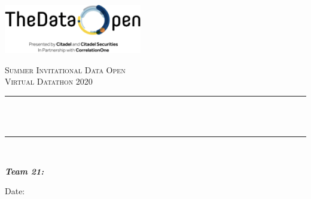 \begin{titlepage}

\newcommand{\HRule}{\rule{\linewidth}{0.5mm}} %



\includegraphics[width = 6cm]{logos/dataopen.png}\\[3.5cm]

\begin{center} %

\textsc{\LARGE Summer Invitational Data Open}\\[0.5cm] 
\textsc{\Large Virtual Datathon 2020}\\[1cm]
\HRule \\[0.4cm]
{ \huge \bfseries \reporttitle}\\ %
\HRule \\[1.5cm]
\end{center}

\begin{flushleft} \large
\textit{\textbf{Team 21:}}\\
\reportauthor %
\end{flushleft}
\vspace{1.5cm}
\makeatletter
Date: \@date 

\vfill %



\makeatother


\end{titlepage}

